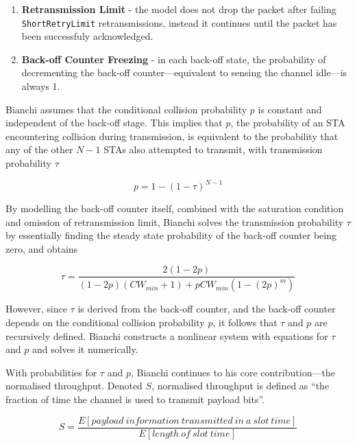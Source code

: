 \begin{enumerate}

	\item \textbf{Retransmission Limit} - the model does not drop the packet
after failing \texttt{ShortRetryLimit} retransmissions, instead it continues
until the packet has been successfuly acknowledged.

	\item \textbf{Back-off Counter Freezing} - in each back-off state, the
probability of decrementing the back-off counter—equivalent to sensing the
channel idle—is always 1.

\end{enumerate}

Bianchi assumes that the conditional collision probability $p$ is constant and
independent of the back-off stage. This implies that $p$, the probability of
an STA encountering collision during transmission, is equivalent to the
probability that any of the other $N-1$ STAs also attempted to transmit, with
transmission probability $\tau$

\begin{equation} \label{eq:pbi}
	p = 1 - (1 - \tau)^{N-1}
\end{equation}

By modelling the back-off counter itself, combined with the saturation
condition and omission of retransmission limit, Bianchi solves the
transmission probability $\tau$ by essentially finding the steady state
probability of the back-off counter being zero, and obtains

\begin{equation} \label{eq:xbi}
	\tau = \frac{2(1-2p)}{(1-2p)(\mathit{CW_{min}}+1)+p\mathit{CW_{min}}(1-(2p)^m)}
\end{equation}

However, since $\tau$ is derived from the back-off counter, and the back-off
counter depends on the conditional collision probability $p$, it follows that
$\tau$ and $p$ are recursively defined. Bianchi constructs a nonlinear system
with equations for $\tau$ and $p$ and solves it numerically.

With probabilities for $\tau$ and $p$, Bianchi continues to his core
contribution—the normalised throughput. Denoted $S$, normalised throughput is
defined as ``the fraction of time the channel is used to transmit payload
bits''.

\begin{equation} \label{eq:ssbi}
	S = \frac{E[\mathit{payload~information~transmitted~in~a~slot~time}]}{E[\mathit{length~of~slot~time}]}
\end{equation}

